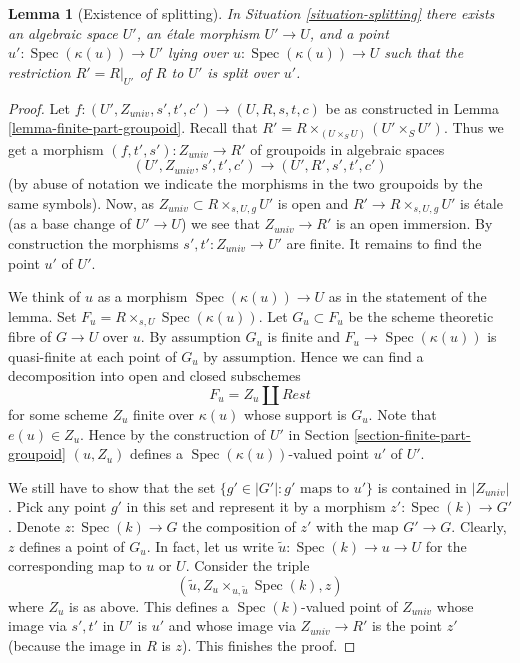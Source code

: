 \documentclass{stacks-project}
\theoremstyle{plain}
\newtheorem{lemma}[subsection]{Lemma}
\theoremstyle{definition}
\theoremstyle{remark}
\numberwithin{equation}{subsection}
\def\Spec{\mathop{\mathrm{Spec}}}
\begin{document}
\begin{lemma}[Existence of splitting]
\label{lemma-splitting}
In Situation \ref{situation-splitting}
there exists an algebraic space $U'$, an \'etale morphism
$U' \to U$, and a point $u' : \Spec(\kappa(u)) \to U'$
lying over $u : \Spec(\kappa(u)) \to U$
such that the restriction $R' = R|_{U'}$ of $R$ to $U'$
is split over $u'$.
\end{lemma}

\begin{proof}
Let $f : (U', Z_{univ}, s', t', c') \to (U, R, s, t, c)$ be as constructed in
Lemma \ref{lemma-finite-part-groupoid}.
Recall that $R' = R \times_{(U \times_S U)} (U' \times_S U')$.
Thus we get a morphism $(f, t', s') : Z_{univ} \to R'$ of groupoids
in algebraic spaces
$$
(U', Z_{univ}, s', t', c') \to (U', R', s', t', c')
$$
(by abuse of notation we indicate the morphisms in the two groupoids
by the same symbols). Now, as $Z_{univ} \subset R \times_{s, U, g} U'$ is open
and $R' \to R \times_{s, U, g} U'$ is \'etale (as a base change
of $U' \to U$) we see that $Z_{univ} \to R'$ is an open immersion.
By construction the morphisms $s', t' : Z_{univ} \to U'$ are finite.
It remains to find the point $u'$ of $U'$.

\medskip\noindent
We think of $u$ as a morphism $\Spec(\kappa(u)) \to U$ as in
the statement of the lemma. Set $F_u = R \times_{s, U} \Spec(\kappa(u))$.
Let $G_u \subset F_u$ be the scheme theoretic fibre of $G \to U$ over $u$.
By assumption $G_u$ is finite and $F_u \to \Spec(\kappa(u))$
is quasi-finite at each point of $G_u$ by assumption.
Hence we can find a decomposition into open and closed subschemes
$$
F_u = Z_u \amalg Rest
$$
for some scheme $Z_u$ finite over $\kappa(u)$ whose support is $G_u$.
Note that $e(u) \in Z_u$. Hence by the construction of $U'$ in
Section \ref{section-finite-part-groupoid}
$(u, Z_u)$ defines a $\Spec(\kappa(u))$-valued
point $u'$ of $U'$.

\medskip\noindent
We still have to show that the set $\{g' \in |G'| : g'\text{ maps to }u'\}$
is contained in $|Z_{univ}|$. Pick any point $g'$ in this set and
represent it by a morphism $z' : \Spec(k) \to G'$. Denote
$z : \Spec(k) \to G$ the composition of $z'$ with the map $G' \to G$.
Clearly, $z$ defines a point of $G_u$. In fact, let us write
$\tilde u : \Spec(k) \to u \to U$ for the corresponding map to $u$ or $U$.
Consider the triple
$$
(\tilde u, Z_u \times_{u, \tilde u} \Spec(k), z)
$$
where $Z_u$ is as above. This defines a $\Spec(k)$-valued point
of $Z_{univ}$ whose image via $s', t'$ in $U'$ is $u'$ and
whose image via $Z_{univ} \to R'$ is the point $z'$
(because the image in $R$ is $z$).
This finishes the proof.
\end{proof}
\end{document}
